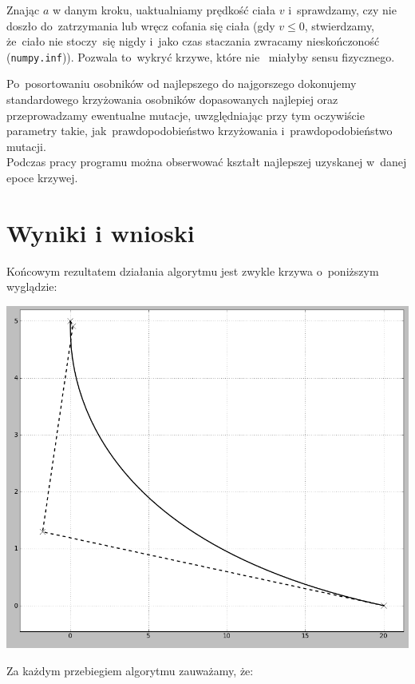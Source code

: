 \documentclass{classrep}
\begin{document}
Znając $a$ w danym kroku, uaktualniamy prędkość ciała $v$ i~sprawdzamy, czy nie doszło do~zatrzymania
lub wręcz cofania się ciała (gdy $v \leq 0$, stwierdzamy, że~ciało nie stoczy~się nigdy i~jako
czas staczania zwracamy nieskończoność (\texttt{numpy.inf})). Pozwala to~wykryć krzywe, które nie~
miałyby sensu fizycznego.

Po~posortowaniu osobników od najlepszego do najgorszego dokonujemy standardowego krzyżowania 
osobników dopasowanych najlepiej oraz przeprowadzamy ewentualne mutacje, uwzględniając przy tym oczywiście
parametry takie, jak~prawdopodobieństwo krzyżowania i~prawdopodobieństwo mutacji. \\

Podczas pracy programu można obserwować kształt najlepszej uzyskanej w~danej epoce krzywej.

\section {Wyniki i wnioski}
Końcowym rezultatem działania algorytmu jest zwykle krzywa o~poniższym wyglądzie:
\begin{center}
\includegraphics[scale=0.30]{screenshot7.png}
\end{center}
Za każdym przebiegiem algorytmu zauważamy, że:
\end{document}
